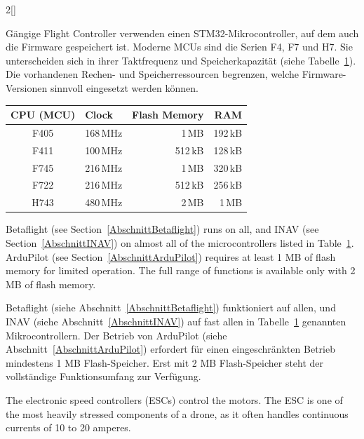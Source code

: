 \begin{paracol}{2}[]
\colger

Gängige Flight Controller verwenden einen STM32-Mikrocontroller, auf dem auch die Firmware gespeichert ist. Moderne MCUs sind die Serien F4, F7 und H7. Sie unterscheiden sich in ihrer Taktfrequenz und Speicherkapazität (siehe Tabelle~\ref{TabelleFCMCU}). Die vorhandenen Rechen- und Speicherressourcen begrenzen, welche Firmware-Versionen sinnvoll eingesetzt werden können.

\colende

\begin{table}[htb!]
\centering
{}
\label{TabelleFCMCU}
\begin{tabular}{c@{\hskip 8mm}l@{\hskip 8mm}r@{\hskip 8mm}r}
\toprule
CPU (MCU)  & Clock    & Flash Memory & RAM     \\
\midrule
F405       & 168\,MHz & 1\,MB        & 192\,kB \\
F411       & 100\,MHz & 512\,kB      & 128\,kB \\
F745       & 216\,MHz & 1\,MB        & 320\,kB \\
F722       & 216\,MHz & 512\,kB      & 256\,kB \\
H743       & 480\,MHz & 2\,MB        & 1\,MB   \\
\bottomrule
\end{tabular}
\end{table}
\FloatBarrier

\colstart

Betaflight (see Section~\ref{AbschnittBetaflight}) runs on all, and INAV (see Section~\ref{AbschnittINAV}) on almost all of the microcontrollers listed in Table~\ref{TabelleFCMCU}. ArduPilot (see Section~\ref{AbschnittArduPilot}) requires at least 1 MB of flash memory for limited operation. The full range of functions is available only with 2 MB of flash memory.

\colger

Betaflight (siehe Abschnitt~\ref{AbschnittBetaflight}) funktioniert auf allen, und INAV (siehe Abschnitt~\ref{AbschnittINAV}) auf fast allen in Tabelle~\ref{TabelleFCMCU} genannten Mikrocontrollern. Der Betrieb von ArduPilot (siehe Abschnitt~\ref{AbschnittArduPilot}) erfordert für einen eingeschränkten Betrieb mindestens 1 MB Flash-Speicher. Erst mit 2 MB Flash-Speicher steht der vollständige Funktionsumfang zur Verfügung.

\coleng

The electronic speed controllers (ESCs) control the motors. The ESC is one of the most heavily stressed components of a drone, as it often handles continuous currents of 10 to 20 amperes.


\end{paracol}
